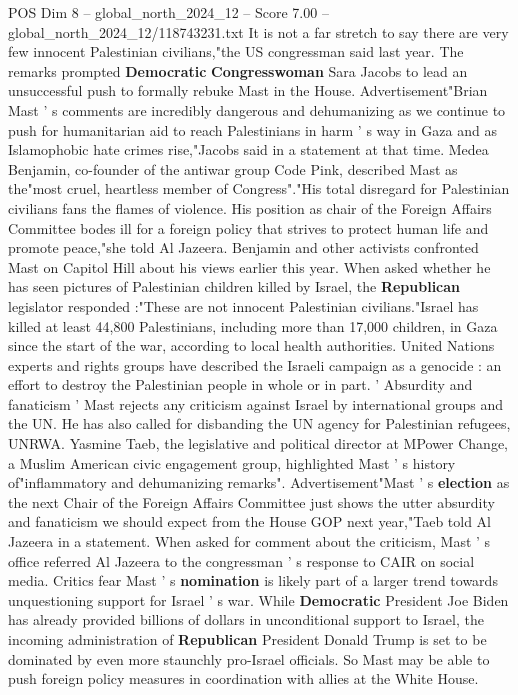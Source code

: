 \begin{textsample}{POS Dim 8 – global\_north\_2024\_12 – Score 7.00 – global\_north\_2024\_12/118743231.txt}
It is not a far stretch to say there are very few innocent Palestinian civilians,"the US congressman said last year.
The remarks prompted \textbf{Democratic} \textbf{Congresswoman} Sara Jacobs to lead an unsuccessful push to formally rebuke Mast in the House.
Advertisement"Brian Mast ' s comments are incredibly dangerous and dehumanizing as we continue to push for humanitarian aid to reach Palestinians in harm ' s way in Gaza and as Islamophobic hate crimes rise,"Jacobs said in a statement at that time.
Medea Benjamin, co-founder of the antiwar group Code Pink, described Mast as the"most cruel, heartless member of Congress"."His total disregard for Palestinian civilians fans the flames of violence.
His position as chair of the Foreign Affairs Committee bodes ill for a foreign policy that strives to protect human life and promote peace,"she told Al Jazeera.
Benjamin and other activists confronted Mast on Capitol Hill about his views earlier this year.
When asked whether he has seen pictures of Palestinian children killed by Israel, the \textbf{Republican} legislator responded :"These are not innocent Palestinian civilians."Israel has killed at least 44,800 Palestinians, including more than 17,000 children, in Gaza since the start of the war, according to local health authorities.
United Nations experts and rights groups have described the Israeli campaign as a genocide : an effort to destroy the Palestinian people in whole or in part. ' Absurdity and fanaticism ' Mast rejects any criticism against Israel by international groups and the UN.
He has also called for disbanding the UN agency for Palestinian refugees, UNRWA.
Yasmine Taeb, the legislative and political director at MPower Change, a Muslim American civic engagement group, highlighted Mast ' s history of"inflammatory and dehumanizing remarks".
Advertisement"Mast ' s \textbf{election} as the next Chair of the Foreign Affairs Committee just shows the utter absurdity and fanaticism we should expect from the House GOP next year,"Taeb told Al Jazeera in a statement.
When asked for comment about the criticism, Mast ' s office referred Al Jazeera to the congressman ' s response to CAIR on social media.
Critics fear Mast ' s \textbf{nomination} is likely part of a larger trend towards unquestioning support for Israel ' s war.
While \textbf{Democratic} President Joe Biden has already provided billions of dollars in unconditional support to Israel, the incoming administration of \textbf{Republican} President Donald Trump is set to be dominated by even more staunchly pro-Israel officials.
So Mast may be able to push foreign policy measures in coordination with allies at the White House.

\end{textsample}

